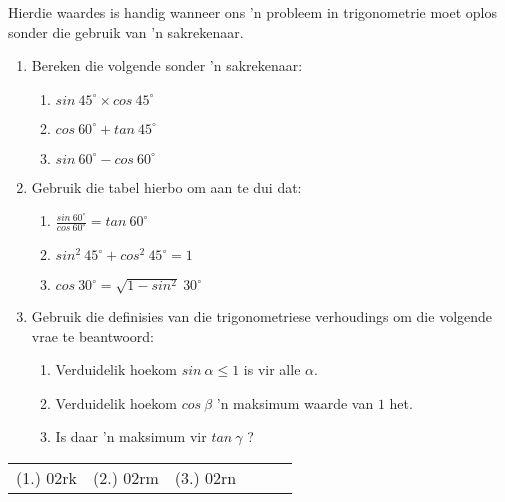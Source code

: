 \par
Hierdie waardes is handig wanneer ons 'n probleem in trigonometrie moet oplos sonder die gebruik van 'n sakrekenaar.\par 
\begin{exercises}{}
{
\begin{enumerate}[itemsep=6pt, label=\textbf{\arabic*}. ] 
\item Bereken die volgende sonder 'n sakrekenaar:
\begin{enumerate}[noitemsep, label=\textbf{(\alph*)} ]
\item $sin~45^{\circ} \times cos~45^{\circ}$
\item $cos~60^{\circ} + tan~45^{\circ}$
\item $sin~60^{\circ} - cos~60^{\circ}$
\end{enumerate}

\item Gebruik die tabel hierbo om aan te dui dat:
\begin{enumerate}[itemsep=5pt, label=\textbf{(\alph*)} ]
\item $\frac{sin~60^{\circ}}{cos~60^{\circ}} = tan~60^{\circ} $
\item $sin^{2}~45^{\circ}+ cos^{2}~45^{\circ} =1 $
\item $cos~30^{\circ} =\sqrt{1- sin^{2}}~30^{\circ}$
\end{enumerate}

\item Gebruik die definisies van die trigonometriese verhoudings om die volgende vrae te beantwoord:
\begin{enumerate}[noitemsep, label=\textbf{(\alph*)} ]
\item Verduidelik hoekom $sin~\alpha \leq 1$ is vir alle $\alpha$.
\item Verduidelik hoekom $cos~\beta$ 'n maksimum waarde van $1$ het.
\item Is daar 'n maksimum vir $tan~\gamma$ ?
\end{enumerate}
\end{enumerate}

\par \practiceinfo
\par \begin{tabular}[h]{cccccc}
(1.)	02rk	&
(2.)	02rm	&
(3.)	02rn	&
\end{tabular}
}
\end{exercises}



